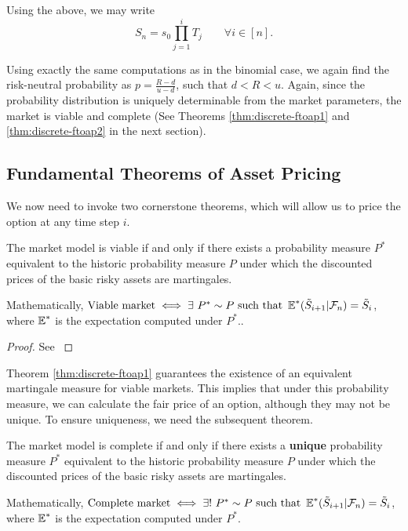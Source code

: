 Using the above, we may write
\begin{equation}
	\label{eq:discrete-risky-prod-iid}
	S_n = s_0 \prod_{j=1}^{i} T_j  \qquad  \forall i \in [n] .
\end{equation}


Using exactly the same computations as in the binomial case, we again find the risk-neutral probability as $ p = \frac{R - d}{u - d} $, such that $ d < R < u $. Again, since the probability distribution is uniquely determinable from the market parameters, the market is viable and complete (See Theorems \ref{thm:discrete-ftoap1} and \ref{thm:discrete-ftoap2} in the next section).



\subsection{Fundamental Theorems of Asset Pricing}

We now need to invoke two cornerstone theorems, which will allow us to price the option at any time step $ i $.

\begin{thm}
	\label{thm:discrete-ftoap1}
	The market model is viable if and only if there exists a probability measure $ P^* $ equivalent to the historic probability measure $ P $ under which the discounted prices of the basic risky assets are martingales.
	
	Mathematically,
	$ \text{Viable market} \iff \exists \  P^* \sim P \text{ such that } \operatorname{\mathbb{E}}^*( \tilde{S}_{i+1} | \mathcal{F}_n ) = \tilde{S}_{i} $, where $ \operatorname{\mathbb{E}}^* $ is the expectation computed under $ P^* $..
\end{thm}

\begin{proof}
	See \cite[page 6, Theorem 1.2.7]{Lamberton1996}
\end{proof}

Theorem \ref{thm:discrete-ftoap1} guarantees the existence of an equivalent martingale measure for viable markets. This implies that under this probability measure, we can calculate the fair price of an option, although they may not be unique. To ensure uniqueness, we need the subsequent theorem.

\begin{thm}
	\label{thm:discrete-ftoap2}
	The market model is complete if and only if there exists a \textbf{unique} probability measure $ P^* $ equivalent to the historic probability measure $ P $ under which the discounted prices of the basic risky assets are martingales.
	
	Mathematically,
	$ \text{Complete market} \iff \exists! \  P^* \sim P \text{ such that } \operatorname{\mathbb{E}}^*( \tilde{S}_{i+1} | \mathcal{F}_n ) = \tilde{S}_{i} $, where $ \operatorname{\mathbb{E}}^* $ is the expectation computed under $ P^* $.
\end{thm}

